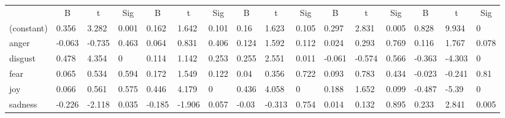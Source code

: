 \documentclass[graybox]{svmult}
\begin{document}
{\begin{table}[ht]
{\begin{tabular}{@{}llll|lll|lll|lll|lll@{}}
\midrule
           
& \multicolumn{1}{c}{B} & \multicolumn{1}{c}{t} &
\multicolumn{1}{c}{Sig} & \multicolumn{1}{c}{B} &
\multicolumn{1}{c}{t} & \multicolumn{1}{c}{Sig} &
\multicolumn{1}{c}{B} & \multicolumn{1}{c}{t} &
\multicolumn{1}{c}{Sig} & \multicolumn{1}{c}{B} &
\multicolumn{1}{c}{t} & \multicolumn{1}{c}{Sig} &
\multicolumn{1}{c}{B} & \multicolumn{1}{c}{t} &
\multicolumn{1}{c}{Sig} \\


(constant) & 0.356                 & 3.282                 & 0.001                   & 0.162                 & 1.642                 & 0.101                   & 0.16                  & 1.623                 & 0.105                   & 0.297      & 2.831     & 0.005    & 0.828          & 9.934   & 0      \\
anger      & -0.063                & -0.735                & 0.463                   & 0.064                 & 0.831                 & 0.406                   & 0.124                 & 1.592                 & 0.112                   & 0.024      & 0.293     & 0.769    & 0.116          & 1.767    & 0.078     \\
disgust    & 0.478                 & 4.354                 & 0                       & 0.114                 & 1.142                 & 0.253                   & 0.255                 & 2.551                 & 0.011                   & -0.061     & -0.574    & 0.566    & -0.363         & -4.303    & 0    \\
fear       & 0.065                 & 0.534                 & 0.594                   & 0.172                 & 1.549                 & 0.122                   & 0.04                  & 0.356                 & 0.722                   & 0.093      & 0.783     & 0.434    & -0.023         & -0.241    & 0.81    \\
joy        & 0.066                 & 0.561                 & 0.575                   & 0.446                 & 4.179                 & 0                       & 0.436                 & 4.058                 & 0                       & 0.188      & 1.652     & 0.099    & -0.487         & -5.39   & 0      \\
sadness    & -0.226                & -2.118                & 0.035                   & -0.185                & -1.906                & 0.057                   & -0.03                 & -0.313                & 0.754                   & 0.014      & 0.132     & 0.895    & 0.233          & 2.841     & 0.005    \\


\end{tabular}}
\end{table}}
\end{document}
